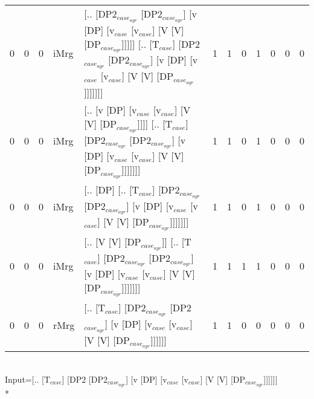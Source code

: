 \begin{tabularx}{\linewidth}{rrrlXrrrrrrr}
   0 &       0 &   0 & iMrg & [.. [DP2$_{case_{agr}}$ [DP2$_{case_{agr}}$] [v [DP] [v$_{case}$ [v$_{case}$] [V [V] [DP$_{case_{agr}}$]]]]] [.. [T$_{case}$] [DP2$_{case_{agr}}$ [DP2$_{case_{agr}}$] [v [DP] [v$_{case}$ [v$_{case}$] [V [V] [DP$_{case_{agr}}$]]]]]]] &             1 &             1 &                  0 &            1 &              0 &            0 &              0 \\
   0 &       0 &   0 & iMrg & [.. [v [DP] [v$_{case}$ [v$_{case}$] [V [V] [DP$_{case_{agr}}$]]]] [.. [T$_{case}$] [DP2$_{case_{agr}}$ [DP2$_{case_{agr}}$] [v [DP] [v$_{case}$ [v$_{case}$] [V [V] [DP$_{case_{agr}}$]]]]]]]                               &             1 &             1 &                  0 &            1 &              0 &            0 &              0 \\
   0 &       0 &   0 & iMrg & [.. [DP] [.. [T$_{case}$] [DP2$_{case_{agr}}$ [DP2$_{case_{agr}}$] [v [DP] [v$_{case}$ [v$_{case}$] [V [V] [DP$_{case_{agr}}$]]]]]]]                                                                           &             1 &             1 &                  0 &            1 &              0 &            0 &              0 \\
   0 &       0 &   0 & iMrg & [.. [V [V] [DP$_{case_{agr}}$]] [.. [T$_{case}$] [DP2$_{case_{agr}}$ [DP2$_{case_{agr}}$] [v [DP] [v$_{case}$ [v$_{case}$] [V [V] [DP$_{case_{agr}}$]]]]]]]                                                          &             1 &             1 &                  1 &            1 &              0 &            0 &              0 \\
   0 &       0 &   0 & rMrg & [.. [T$_{case}$] [DP2$_{case_{agr}}$ [DP2$_{case_{agr}}$] [v [DP] [v$_{case}$ [v$_{case}$] [V [V] [DP$_{case_{agr}}$]]]]]]                                                                                     &             1 &             1 &                  0 &            0 &              0 &            0 &              0 \\
\hline
\end{tabularx}\endgroup\\
\begingroup\scriptsize Input=[.. [T$_{case}$] [DP2 [DP2$_{case_{agr}}$] [v [DP] [v$_{case}$ [v$_{case}$] [V [V] [DP$_{case_{agr}}$]]]]]]\\*
